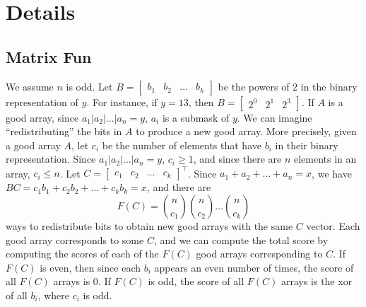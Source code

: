 \documentclass[11pt]{scrartcl}
\begin{document}
\section{Details}
\subsection{Matrix Fun}
We assume $n$ is odd.
Let $B = \begin{bmatrix}
  b_1 & b_2 & \dots & b_k
\end{bmatrix}$
be the powers of $2$ in the binary representation of $y$.
For instance, if $y = 13$, then $B = \begin{bmatrix}
  2^0 & 2^1 & 2^3
\end{bmatrix}$.
If $A$ is a good array, since $a_1 | a_2 | \dots | a_n = y$, $a_i$ is a submask of $y$.
We can imagine ``redistributing'' the bits in $A$ to produce a new good array.
More precisely, given a good array $A$, let $c_i$ be the number of elements that have $b_i$ in their binary representation.
Since $a_1 | a_2 | \dots | a_n = y$, $c_i \geq 1$, and since there are $n$ elements in an array, $c_i \leq n$.
Let $C = \begin{bmatrix} c_1 & c_2 & \dots & c_k \end{bmatrix}^\top$.
Since $a_1 + a_2 + \dots + a_n = x$,
we have $BC = c_1 b_1 + c_2 b_2 + \dots + c_k b_k = x$, and there are
\[
  F(C) = {n \choose c_1} {n \choose c_2} \dots {n \choose c_k}
\]
ways to redistribute bits to obtain new good arrays with the same $C$ vector.
Each good array corresponds to some $C$, and we can compute the total score by computing the scores of each of the $F(C)$ good arrays corresponding to $C$.
If $F(C)$ is even, then since each $b_i$ appears an even number of times, the score of all $F(C)$ arrays is $0$.
If $F(C)$ is odd, the score of all $F(C)$ arrays is the xor of all $b_i$, where $c_i$ is odd.
\end{document}
